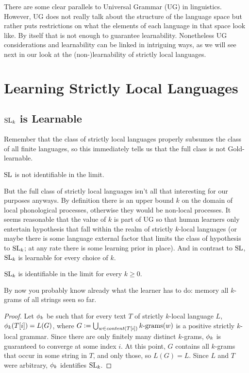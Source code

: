 There are some clear parallels to Universal Grammar (UG) in linguistics.
However, UG does not really talk about the structure of the language space but rather puts restrictions on what the elements of each language in that space look like.
By itself that is not enough to guarantee learnability.
Nonetheless UG considerations and learnability can be linked in intriguing ways, as we will see next in our look at the (non-)learnability of strictly local languages.

\section{Learning Strictly Local Languages}

\subsection{\texorpdfstring{$\SL_k$ is Learnable}{SLk is Learnable}}
%
Remember that the class of strictly local languages properly subsumes the class of all finite languages, so this immediately tells us that the full class is not Gold-learnable.
%
\begin{corollary}
    $\SL$ is not identifiable in the limit.
\end{corollary}

But the full class of strictly local languages isn't all that interesting for our purposes anyways.
By definition there is an upper bound $k$ on the domain of local phonological processes, otherwise they would be non-local processes.
It seems reasonable that the value of $k$ is part of UG so that human learners only entertain hypothesis that fall within the realm of strictly $k$-local languages (or maybe there is some language external factor that limits the class of hypothesis to $\SL_k$; at any rate there is some learning prior in place).
And in contrast to $\SL$, $\SL_k$ is learnable for every choice of $k$.
%
\begin{theorem}
    $\SL_k$ is identifiable in the limit for every $k \geq 0$.
\end{theorem}
%
By now you probably know already what the learner has to do: memory all $k$-grams of all strings seen so far.
%
\begin{proof}
    Let $\Learner_k$ be such that for every text $T$ of strictly $k$-local language $L$, $\Learner_k(T[i]) = L(G)$, where $G \is \bigcup_{w \in \contentof(T[i])} \Bigrams[k](w)$ is a positive strictly $k$-local grammar.
    Since there are only finitely many distinct $k$-grams, $\Learner_k$ is guaranteed to converge at some index $i$.
    At this point, $G$ contains all $k$-grams that occur in some string in $T$, and only those, so $L(G) = L$.
    Since $L$ and $T$ were arbitrary, $\Learner_k$ identifies $\SL_k$.
\end{proof}

